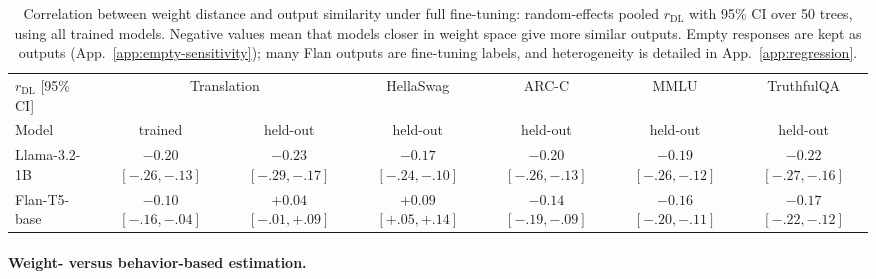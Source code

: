 \documentclass{article}
\theoremstyle{definition}
\theoremstyle{plain}
\begin{document}
\begin{table}[t]
\caption{Correlation between weight distance and output similarity under full fine-tuning: random-effects pooled
  $r_{\mathrm{DL}}$ with 95\% CI over 50 trees, using all trained models. Negative values mean that models closer in weight space give more similar outputs. Empty responses are kept as outputs (App.~\ref{app:empty-sensitivity}); many Flan outputs are fine-tuning labels, and heterogeneity is detailed in App.~\ref{app:regression}.}
\label{tab:behavior_holdout}
\centering
\small
\setlength{\tabcolsep}{5pt}
\begin{tabular}{lcccccc}
\toprule
$r_{\mathrm{DL}}$ [95\% CI] & \multicolumn{2}{c}{Translation} & HellaSwag & ARC-C & MMLU & TruthfulQA \\
\cmidrule(lr){2-3}
Model & trained & held-out & held-out & held-out & held-out & held-out \\
\midrule
Llama-3.2-1B & \shortstack{$-0.20$\\{\scriptsize$[-.26,-.13]$}} & \shortstack{$-0.23$\\{\scriptsize$[-.29,-.17]$}} & \shortstack{$-0.17$\\{\scriptsize$[-.24,-.10]$}} & \shortstack{$-0.20$\\{\scriptsize$[-.26,-.13]$}} & \shortstack{$-0.19$\\{\scriptsize$[-.26,-.12]$}} & \shortstack{$-0.22$\\{\scriptsize$[-.27,-.16]$}} \\
\addlinespace
Flan-T5-base & \shortstack{$-0.10$\\{\scriptsize$[-.16,-.04]$}} & \shortstack{$+0.04$\\{\scriptsize$[-.01,+.09]$}} & \shortstack{$+0.09$\\{\scriptsize$[+.05,+.14]$}} & \shortstack{$-0.14$\\{\scriptsize$[-.19,-.09]$}} & \shortstack{$-0.16$\\{\scriptsize$[-.20,-.11]$}} & \shortstack{$-0.17$\\{\scriptsize$[-.22,-.12]$}} \\
\bottomrule
\end{tabular}
\end{table}


\paragraph{Weight- versus behavior-based estimation.}
\label{sec:results:blackbox}
\end{document}
